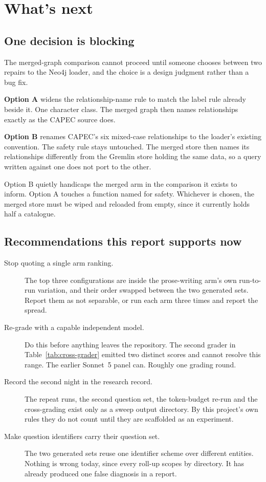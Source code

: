 \section{What's next}

\subsection{One decision is blocking}

The merged-graph comparison cannot proceed until someone chooses between two
repairs to the Neo4j loader, and the choice is a design judgment rather than a
bug fix.

\textbf{Option A} widens the relationship-name rule to match the label rule
already beside it. One character class. The merged graph then names
relationships exactly as the CAPEC source does.

\textbf{Option B} renames CAPEC's six mixed-case relationships to the loader's
existing convention. The safety rule stays untouched. The merged store then
names its relationships differently from the Gremlin store holding the same
data, so a query written against one does not port to the other.

Option B quietly handicaps the merged arm in the comparison it exists to inform.
Option A touches a function named for safety. Whichever is chosen, the merged
store must be wiped and reloaded from empty, since it currently holds half a
catalogue.

\subsection{Recommendations this report supports now}

\begin{description}
  \item[Stop quoting a single arm ranking.] The top three configurations are
    inside the prose-writing arm's own run-to-run variation, and their order
    swapped between the two generated sets. Report them as not separable, or run
    each arm three times and report the spread.
  \item[Re-grade with a capable independent model.] Do this before anything
    leaves the repository. The second grader in Table~\ref{tab:cross-grader}
    emitted two distinct scores and cannot resolve this range. The earlier
    Sonnet~5 panel can. Roughly one grading round.
  \item[Record the second night in the research record.] The repeat runs, the
    second question set, the token-budget re-run and the cross-grading exist
    only as a sweep output directory. By this project's own rules they do not
    count until they are scaffolded as an experiment.
  \item[Make question identifiers carry their question set.] The two generated
    sets reuse one identifier scheme over different entities. Nothing is wrong
    today, since every roll-up scopes by directory. It has already produced one
    false diagnosis in a report.
\end{description}


